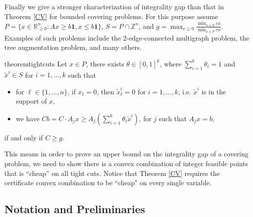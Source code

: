 Finally we give a stronger characterization of integrality gap than that in Theorem \ref{CV} for bounded covering problems. For this purpose assume $P= \{x\in \mathbb{R}^n_{\geq 0}: Ax\geq b\textbf{1}, x \leq b\textbf{1}\}$, $S= P\cap \mathbb{Z}^n$, and $g= \max_{c\geq 0} \frac{\min_{x\in S}cx}{\min_{x\in P}cx}$. Examples of such problems include the 2-edge-connected multigraph problem, the tree augmentation problem, and many others.


\begin{restatable}{theorem}{tightcuts}
	\label{tightcuts}
	 Let $x\in P$, there exists $\theta\in [0,1]^k$, where $\sum_{i=1}^{k}\theta_i = 1$ and $\tilde{x}^i \in S$ for $i=1,\ldots,k$ such that \begin{itemize}
		\item for $\ell\in \{1,\ldots,n\}$, if $x_\ell =0$, then $\tilde{x}^i_\ell=0$ for $i =1,\ldots,k$, i.e. $\tilde{x}^i$ is in the support of $x$,
		\item we have $Cb = C\cdot A_j x \geq A_j (\sum_{i=1}^{k}\theta_i\tilde{x}^i)$, for $j$ such that $A_j x =b$,  
	\end{itemize}
	if and only if $C\geq g$.
\end{restatable}



This means in order to prove an upper bound on the integrality gap of a covering problem, we need to show there is a convex combination of integer feasible points that is ``cheap'' on all tight cuts. Notice that Theorem \ref{CV} requires the certificate convex combination to be ``cheap" on every single variable.


\subsection{Notation and Preliminaries}

